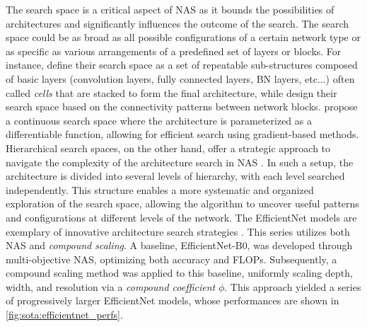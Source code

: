 The search space is a critical aspect of \ac{NAS} as it bounds the possibilities
of architectures and significantly influences the outcome of the search. The
search space could be as broad as all possible configurations of a certain
network type or as specific as various arrangements of a predefined set of
layers or blocks. For instance, \cite{DBLP:conf/iclr/ZophL17} define their
search space as a set of repeatable sub-structures composed of basic layers
(convolution layers, fully connected layers, \ac{BN} layers, etc...)
often called \emph{cells} that are stacked to form the final architecture, while
\cite{DBLP:conf/iclr/XieZLL19} design their search space based on the
connectivity patterns between network blocks. \cite{DBLP:conf/iclr/LiuSY19}
propose a continuous search space where the architecture is parameterized as a
differentiable function, allowing for efficient search using gradient-based
methods. Hierarchical search spaces, on the other hand, offer a strategic
approach to navigate the complexity of the architecture search in \ac{NAS}
\cite{DBLP:conf/cvpr/LiuCSAHY019,DBLP:conf/cvpr/TanCPVSHL19}. In such a setup,
the architecture is divided into several levels of hierarchy, with each level
searched independently. This structure enables a more systematic and organized
exploration of the search space, allowing the algorithm to uncover useful
patterns and configurations at different levels of the network. The EfficientNet
models are exemplary of innovative architecture search strategies
\cite{DBLP:conf/icml/TanL19}. This series utilizes both \ac{NAS} and
\emph{compound scaling}. A baseline, EfficientNet-B0, was developed through
multi-objective \ac{NAS}, optimizing both accuracy and \acp{FLOP}. Subsequently, a
compound scaling method was applied to this baseline, uniformly scaling depth,
width, and resolution via a \emph{compound coefficient} $\phi$. This approach
yielded a series of progressively larger EfficientNet models, whose performances
are shown in \ref{fig:sota:efficientnet_perfs}.\\\


